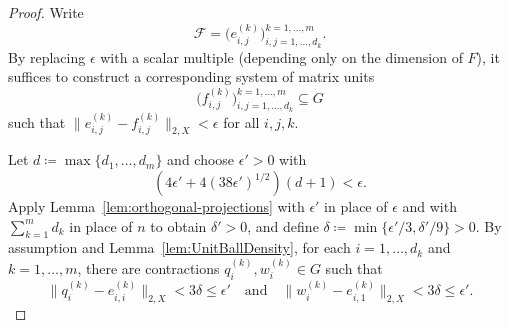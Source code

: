 \documentclass[a4paper,11pt]{amsart}
\theoremstyle{definition}
\numberwithin{equation}{section}
\numberwithin{theorem}{section}
\begin{document}
\begin{proof}
	Write
	\begin{equation}
		\mathcal F = \big(e_{i, j}^{(k)}\big)_{i, j = 1, \ldots, d_k}^{k = 1, \ldots, m}.
	\end{equation}
	By replacing $\epsilon$ with a scalar multiple (depending only on the dimension of $F$), it suffices to construct a corresponding system of matrix units 
	\begin{equation}
		\big(f_{i, j}^{(k)}\big)_{i, j = 1, \ldots, d_k}^{k = 1, \ldots, m} \subseteq G
	\end{equation}
	such that $\big\| e_{i, j}^{(k)} - f_{i, j}^{(k)} \big\|_{2, X} < \epsilon$ for all $i, j, k$.
	
	Let $d \coloneqq \max \{d_1, \ldots, d_m \}$ and choose $\epsilon' > 0$ with 
	\begin{equation}
		\label{eq:epsilon-prime}
		(4\epsilon' + 4(38\epsilon')^{1/2})(d + 1) < \epsilon.
	\end{equation}
	Apply Lemma~\ref{lem:orthogonal-projections} with $\epsilon'$ in place of $\epsilon$ and with $\sum_{k=1}^m d_k$ in place of $n$ to obtain $\delta' > 0$, and define $\delta \coloneqq \min\{ \epsilon'/3, \delta'/9 \} > 0$.  By assumption and Lemma~\ref{lem:UnitBallDensity}, for each $i =1, \ldots, d_k$ and $k = 1, \ldots, m$, there are contractions $q_{i}^{(k)}, w_{i}^{(k)} \in G$ such that 
	\begin{equation}
		\label{eq:close-to-matrix-units}
		\big\|  q_{i}^{(k)} - e_{i,i}^{(k)} \big\|_{2, X} < 3 \delta \leq \epsilon' \quad \text{and} \quad \big\| w_{i}^{(k)} - e_{i,1}^{(k)} \big\|_{2, X} < 3 \delta \leq \epsilon'.
	\end{equation}
	

\end{proof}
\end{document}
